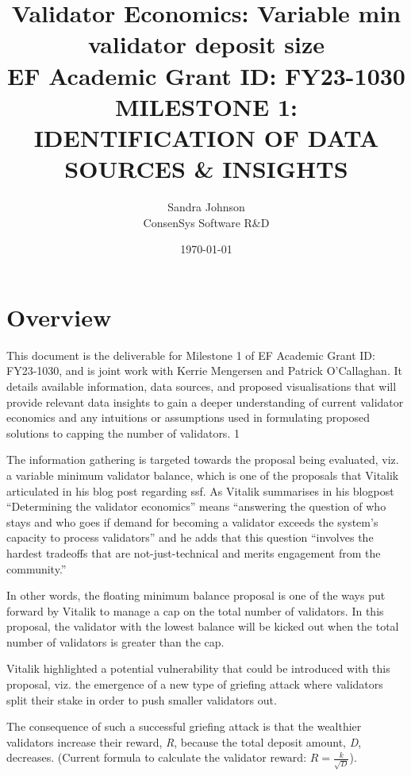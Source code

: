 \documentclass[UTF8]{article}
\title{Validator Economics: Variable min validator deposit size\\
\vspace{4pt}
\large EF Academic Grant ID: FY23-1030\\
\vspace{16pt}
MILESTONE 1: IDENTIFICATION OF DATA SOURCES \& INSIGHTS}
\author{Sandra Johnson\\
ConsenSys Software R\&D}
\date{\today}                                           %
\begin{document}
\maketitle



\section{Overview}
This document is the deliverable for Milestone 1 of EF Academic Grant ID: FY23-1030, and is joint work with Kerrie Mengersen and Patrick O'Callaghan. It details available information, data sources, and proposed visualisations that will provide relevant data insights to gain a deeper understanding of current validator economics and any intuitions or assumptions used in formulating proposed solutions to capping the number of validators. 1

The information gathering is targeted towards the proposal being evaluated, viz. a variable minimum validator balance, which is one of the proposals that Vitalik articulated in his blog post regarding \gls{ssf}.  As Vitalik summarises in his blogpost ``Determining the validator economics'' means ``answering the question of who stays and who goes if demand for becoming a validator exceeds the system's capacity to process validators'' and he adds that this question ``involves the hardest tradeoffs that are not-just-technical and merits engagement from the community.''

In other words, the floating minimum balance proposal is one of the ways put forward by Vitalik to manage a cap on the total number of validators. In this proposal, the validator with the lowest balance will be kicked out when the total number of validators is greater than the cap. 

Vitalik highlighted a potential vulnerability that could be introduced with this proposal, viz. the emergence of a new type of griefing attack \cite{Buterin2018c} where validators split their stake in order to push smaller validators out. 

The consequence of such a successful griefing attack is that the wealthier validators increase their reward, \textit{R}, because the total deposit amount, \textit{D}, decreases. (Current formula to calculate the validator reward: $R = \frac{k}{\sqrt{D}}$).
\end{document}
